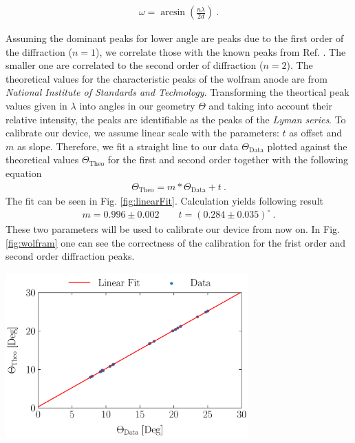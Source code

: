 \begin{gather}
    \omega = \arcsin\left(\frac{n \lambda}{2 d}\right)~.
    \label{eq:angle}
\end{gather}

Assuming the dominant peaks for lower angle are peaks due to the first order of the diffraction ($n = 1$), we correlate those with the known peaks from Ref. . The smaller one are correlated to the second order of diffraction ($n = 2$). The theoretical values for the characteristic peaks of the wolfram anode are from \textit{National Institute of Standards and Technology}. Transforming the theortical peak values given in $\lambda$ into angles in our geometry $\Theta$ and taking into account their relative intensity, the peaks are identifiable as the peaks of the \textit{Lyman series}.
\bigskip
To calibrate our device, we assume linear scale with the parameters: $t$ as offset and $m$ as slope. Therefore, we 
fit a straight line to our data $\Theta_\mathrm{Data}$ plotted against the theoretical values $\Theta_\mathrm{Theo}$ for the first and second order together with the following equation
\begin{gather}
    \Theta_\mathrm{Theo} = m * \Theta_\mathrm{Data} + t~.
    \label{eq:fitLin}
\end{gather}
The fit can be seen in Fig. \ref{fig:linearFit}. Calculation yields following result
\begin{gather*}
    \boxed{m = 0.996 \pm 0.002 \qquad t = (0.284 \pm 0.035)^\circ}~.
\end{gather*}
These two parameters will be used to calibrate our device from now on. In Fig. \ref{fig:wolfram} one can see the correctness of the calibration for the frist order and second order diffraction peaks.

\begin{center}
    \captionsetup{type = figure}
    \includegraphics[width = 0.7\textwidth]{Pictures/Evaluation/41/Linear-Fit.pdf}
    \label{fig:linearFit}
\end{center}

